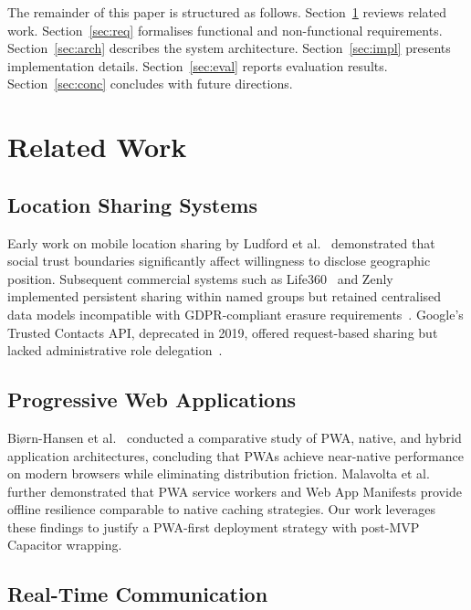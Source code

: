 \documentclass[conference]{IEEEtran}
\begin{document}
The remainder of this paper is structured as follows.
Section~\ref{sec:related} reviews related work. Section~\ref{sec:req}
formalises functional and non-functional requirements.
Section~\ref{sec:arch} describes the system architecture.
Section~\ref{sec:impl} presents implementation details.
Section~\ref{sec:eval} reports evaluation results.
Section~\ref{sec:conc} concludes with future directions.

\section{Related Work}
\label{sec:related}

\subsection{Location Sharing Systems}

Early work on mobile location sharing by Ludford et al.~\cite{ludford2006}
demonstrated that social trust boundaries significantly affect
willingness to disclose geographic position. Subsequent commercial
systems such as Life360~\cite{life360} and Zenly~\cite{zenly}
implemented persistent sharing within named groups but retained
centralised data models incompatible with GDPR-compliant erasure
requirements~\cite{gdpr2016}. Google's Trusted Contacts API,
deprecated in 2019, offered request-based sharing but lacked
administrative role delegation~\cite{googletc}.

\subsection{Progressive Web Applications}

Biørn-Hansen et al.~\cite{biornhansen2017} conducted a comparative
study of PWA, native, and hybrid application architectures, concluding
that PWAs achieve near-native performance on modern browsers while
eliminating distribution friction. Malavolta et al.~\cite{malavolta2020}
further demonstrated that PWA service workers and Web App Manifests
provide offline resilience comparable to native caching strategies.
Our work leverages these findings to justify a PWA-first deployment
strategy with post-MVP Capacitor wrapping.

\subsection{Real-Time Communication}
\end{document}
